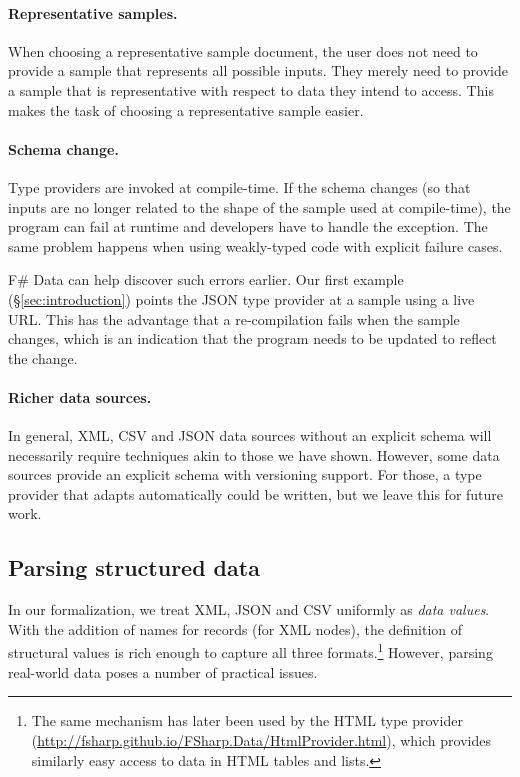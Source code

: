\documentclass[10pt,nocopyrightspace]{sigplanconf}
\begin{document}
\paragraph{Representative samples.}
When choosing a representative sample document, the user does not need to provide a sample
that represents all possible inputs. They merely need to provide a sample that is representative
with respect to data they intend to access. This makes the task of choosing a representative
sample easier.

\paragraph{Schema change.}
Type providers are invoked at compile-time. If the schema changes (so that inputs are no longer
related to the shape of the sample used at compile-time), the program can fail at runtime and
developers have to handle the exception. The same problem happens when using weakly-typed code
with explicit failure cases.

F\# Data can help discover such errors earlier. Our first example (\S\ref{sec:introduction})
points the JSON type provider at a sample using a live URL. This has the advantage that a
re-compilation fails when the sample changes, which is an indication that the program needs to be
updated to reflect the change.

\paragraph{Richer data sources.}
In general, XML, CSV and JSON data sources without an explicit schema will necessarily require
techniques akin to those we have shown. However, some data sources provide an explicit schema with
versioning support. For those, a type provider that adapts automatically could be written,
but we leave this for future work.



\subsection{Parsing structured data}
\label{sec:impl-parsing}

In our formalization, we treat XML, JSON and CSV uniformly as \emph{data values}. With the addition of
names for records (for XML nodes), the definition of structural values is rich enough to capture all
three formats.\footnote{The same mechanism has later been used by the HTML type provider
(\url{http://fsharp.github.io/FSharp.Data/HtmlProvider.html}), which provides similarly easy
access to data in HTML tables and lists.} However, parsing real-world data poses a number of practical issues.
\end{document}
